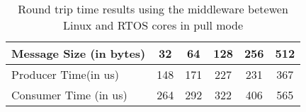 \begin{table}
\centering
\caption{Round trip time results using the middleware betewen Linux and RTOS
    cores in pull mode}
\label{table:broker_communication_linux_RTOS_cores_pull}
\begin{tabular}{lccccc}
\toprule
Message Size (in bytes) & 32 & 64 & 128 & 256 & 512 \\
\midrule
Producer Time(in us) & 148 & 171 & 227 & 231 & 367 \\
Consumer Time (in us) & 264 & 292 & 322 & 406 & 565 \\
\bottomrule
\end{tabular}
\end{table}
